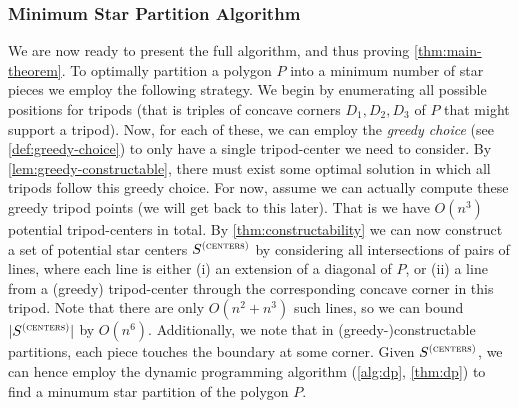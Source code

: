 \documentclass[10pt,a4paper]{article}
\newcommand\Scen{S^{\textsc{(centers)}}}
\begin{document}
\subsubsection{Minimum Star Partition Algorithm}
We are now ready to present the full algorithm, and thus proving \cref{thm:main-theorem}.
To optimally partition a polygon $P$ into a minimum number of star pieces we employ the following strategy. We begin by enumerating all possible positions for tripods (that is triples of concave corners $D_1, D_2, D_3$ of $P$ that might support a tripod). Now, for each of these, we can employ the \emph{greedy choice} (see \cref{def:greedy-choice}) to only have a single tripod-center we need to consider. By \cref{lem:greedy-constructable}, there must exist some optimal solution in which all tripods follow this greedy choice. For now, assume we can actually compute these greedy tripod points (we will get back to this later). That is we have $O(n^3)$ potential tripod-centers in total. By \cref{thm:constructability} we can now construct a set of potential star centers $\Scen$ by considering all intersections of pairs of lines, where each line is either (i) an extension of a diagonal of $P$, or (ii) a line from a (greedy) tripod-center through the corresponding concave corner in this tripod. Note that there are only $O(n^2 + n^3)$ such lines, so we can bound $|\Scen|$ by $O(n^6)$.
Additionally, we note that in (greedy-)constructable partitions, each piece touches the boundary at some corner.
Given $\Scen$, we can hence employ the dynamic programming algorithm (\cref{alg:dp}, \cref{thm:dp}) to find a minumum star partition of the polygon $P$.
\end{document}
